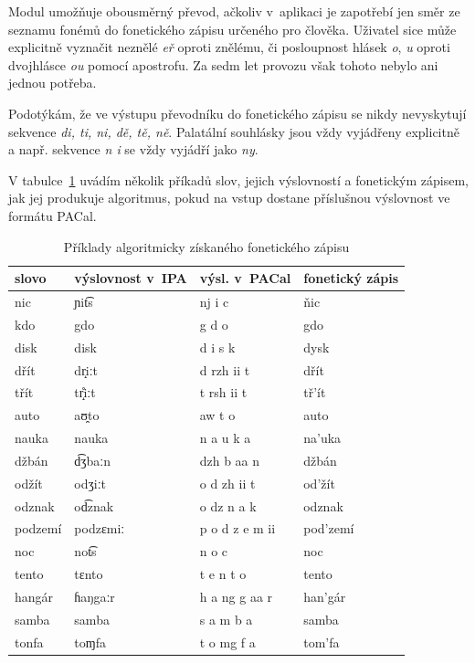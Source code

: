 Modul umožňuje obousměrný převod, ačkoliv v~aplikaci je zapotřebí jen směr ze seznamu fonémů do
fonetického zápisu určeného pro člověka. Uživatel sice může explicitně vyznačit
neznělé {\em eř} oproti znělému, či posloupnost hlásek {\em o}, {\em u} oproti
dvojhlásce {\em ou} pomocí apostrofu. Za sedm let provozu však tohoto nebylo ani
jednou potřeba.

Podotýkám, že ve výstupu převodníku do fonetického zápisu se nikdy nevyskytují
sekvence {\em di, ti, ni, dě, tě, ně}. Palatální souhlásky jsou vždy vyjádřeny
explicitně a např. sekvence {\em n i} se vždy vyjádří jako {\em ny}.

V tabulce~\ref{tab:priklady-fonetiky} uvádím několik příkadů slov, jejich výslovností a fonetickým zápisem, jak jej
produkuje algoritmus, pokud na vstup dostane příslušnou výslovnost ve formátu
PACal.

\begin{table}[htpb]
\begin{center}
\begin{tabular}{|l|l|l|l|}
\hline
slovo & výslovnost v~IPA & výsl. v~PACal & fonetický zápis \\
\hline
nic & ɲit͡s  & nj i c & ňic \\
kdo & gdo & g d o & gdo \\
disk & disk & d i s k & dysk \\
dřít & dr̝iːt & d rzh ii t & dřít \\
třít & tr̝̊iːt & t rsh ii t & tř'ít \\
auto & aʊ̯to & aw t o & auto \\
nauka & nauka & n a u k a & na'uka \\
džbán & d͡ʒbaːn  & dzh b aa n & džbán \\
odžít & odʒiːt & o d zh ii t & od'žít \\
odznak & od͡znak  & o dz n a k & odznak \\
podzemí & podzɛmiː & p o d z e m ii & pod'zemí \\
noc & not͡s  & n o c & noc \\
tento & tɛnto & t e n t o & tento \\
hangár & ɦaŋgaːr & h a ng g aa r & han'gár \\
samba & samba & s a m b a & samba \\
tonfa & toɱfa & t o mg f a & tom'fa \\
\hline
\end{tabular}
\caption{Příklady algoritmicky získaného fonetického zápisu}\label{tab:priklady-fonetiky}
\end{center}
\end{table}
\normalfont

